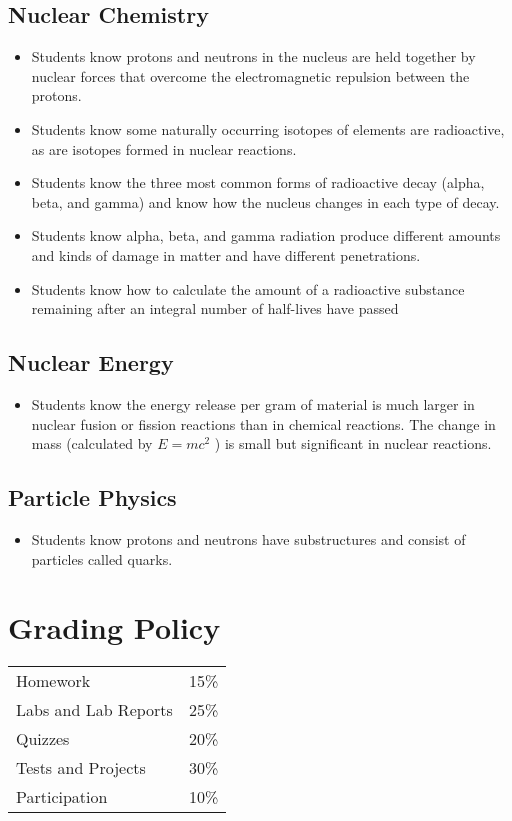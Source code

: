 \documentclass[12pt]{article}
\begin{document}
\subsection{Nuclear Chemistry}

\begin{itemize}
    \item Students know protons and neutrons in the nucleus are held together by nuclear forces that overcome the electromagnetic repulsion between the protons.
    \item Students know some naturally occurring isotopes of elements are radioactive, as are isotopes formed in nuclear reactions.
    \item Students know the three most common forms of radioactive decay (alpha, beta, and gamma) and know how the nucleus changes in each type of decay.
    \item Students know alpha, beta, and gamma radiation produce different amounts and kinds of damage in matter and have different penetrations.
    \item Students know how to calculate the amount of a radioactive substance remaining after an integral number of half-lives have passed
\end{itemize}

\subsection{Nuclear Energy}

\begin{itemize}
    \item Students know the energy release per gram of material is much larger in nuclear fusion or fission reactions than in chemical reactions. The change in mass (calculated by $E = mc^2$ ) is small but significant in nuclear reactions.
\end{itemize}

\subsection{Particle Physics}

\begin{itemize}
    \item Students know protons and neutrons have substructures and consist of particles called quarks.
\end{itemize}



\section*{Grading Policy}
\begin{tabular}{ll}
Homework & 15\% \\
Labs and Lab Reports & 25\% \\
Quizzes & 20\% \\
Tests and Projects & 30\% \\
Participation & 10\% \\
\end{tabular}
\end{document}
